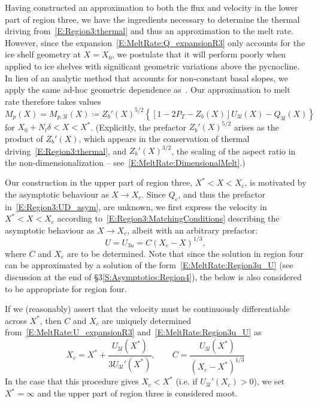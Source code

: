 \documentclass[openacc]{rsproca_new}%
\newcommand{\lt}{\delta} %
\newcommand{\Pt}{\textit{P}_T}
\begin{document}
Having constructed an approximation to both the flux and velocity in the lower part of region three, we have the ingredients necessary to determine the thermal driving from~\eqref{E:Region3:thermal} and thus an approximation to the melt rate. However, since the expansion~\eqref{E:MeltRate:Q_expansionR3} only accounts for the ice shelf geometry at $X = X_0$, we postulate that it will perform poorly when applied to ice shelves with significant geometric variations above the pycnocline. In lieu of an analytic method that accounts for non-constant basal slopes, we apply the same ad-hoc geometric dependence as~\citet{Lazeroms2018TheCryo}. Our approximation to melt rate therefore takes values
\begin{equation}\label{E:MeltRate:regions3_l}
M_{p}(X) = M_{p,3l}(X)\coloneqq Z_b'(X)^{5/2}\left\{\left[1  - 2\Pt -  Z_b(X)\right] U_{3l}(X) - Q_{3l}(X)\right\}
\end{equation}
for $X_0 + N_l \lt < X < X^*$. (Explicitly, the prefactor $Z_b'(X)^{5/2}$ arises as the product of $Z_b'(X)$, which appears in the conservation of thermal driving~\eqref{E:Region3:thermal}, and $Z_b'(X)^{3/2}$, the scaling of the aspect ratio in the non-dimensionalization -- see~\eqref{E:MeltRate:DimensionalMelt}.)

Our construction in the upper part of region three, $X^* < X < X_c$, is motivated by the asymptotic behaviour as $X \to X_c$. Since $Q_c$, and thus the prefactor in~\eqref{E:Region3:UD_asym}, are unknown, we first express the velocity in $X^* < X < X_c$ according to~\eqref{E:Region3:MatchingConditions} describing the asymptotic behaviour as $X\to X_c$, albeit with an arbitrary prefactor:
\begin{equation}\label{E:MeltRate:Region3u_U}
U =U_{3u} =  C (X_c - X)^{1/3},
\end{equation} 
where $C$ and $X_c$ are to be determined. Note that since the solution in region four can be approximated by a solution of the form~\eqref{E:MeltRate:Region3u_U} (see discussion at the end of \S3\ref{S:Asymptotics:Region4}), the below is also considered to be appropriate for region four.

If we (reasonably) assert that the velocity must be continuously differentiable across $X^*$, then $C$ and $X_c$ are uniquely determined from~\eqref{E:MeltRate:U_expansionR3} and~\eqref{E:MeltRate:Region3u_U} as
\begin{equation}\label{E:MeltRate:Xc_expression}
X_c = X^* + \frac{U_{3l}(X^*)}{3 U_{3l}'(X^*)}, \qquad C = \frac{U_{3l}(X^*)}{\left(X_c - X^*\right)^{1/3}}
\end{equation}
In the case that this procedure gives $X_c < X^*$ (i.e. if $U_{3l}'(X_c) > 0$), we set $X^* = \infty$ and the upper part of region three is considered moot.
\end{document}
